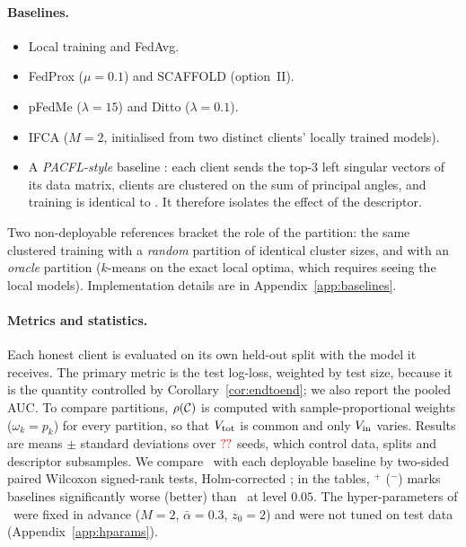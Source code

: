 \paragraph{Baselines.}
\begin{itemize}[leftmargin=1.2em,itemsep=2pt]
  \item Local training and FedAvg.
  \item FedProx ($\mu=0.1$) and SCAFFOLD (option~II).
  \item pFedMe ($\lambda=15$) and Ditto ($\lambda=0.1$).
  \item IFCA ($M=2$, initialised from two distinct clients' locally trained models).
  \item A \emph{PACFL-style} baseline \citep{vahidian2023efficient}: each client sends the
    top-$3$ left singular vectors of its data matrix, clients are clustered on the sum of
    principal angles, and training is identical to \ptopofl. It therefore isolates the
    effect of the descriptor.
\end{itemize}
Two non-deployable references bracket the role of the partition: the same clustered training
with a \emph{random} partition of identical cluster sizes, and with an \emph{oracle}
partition ($k$-means on the exact local optima, which requires seeing the local models).
Implementation details are in Appendix~\ref{app:baselines}.

\paragraph{Metrics and statistics.}
Each honest client is evaluated on its own held-out split with the model it receives. The
primary metric is the test log-loss, weighted by test size, because it is the quantity
controlled by Corollary~\ref{cor:endtoend}; we also report the pooled AUC. To compare partitions, $\rho(\mathcal{C})$ is computed with
sample-proportional weights ($\omega_k=p_k$) for every partition, so that $V_{\mathrm{tot}}$ is common
and only $V_{\mathrm{in}}$ varies. Results are means
$\pm$ standard deviations over $\textcolor{red}{??}$ seeds, which control data, splits and descriptor
subsamples. We compare \ptopofl\ with each deployable baseline by two-sided paired Wilcoxon
signed-rank tests, Holm-corrected \citep{holm1979simple}; in the tables, $^{+}$ ($^{-}$)
marks baselines significantly worse (better) than \ptopofl\ at level $0.05$. The
hyper-parameters of \ptopofl\ were fixed in advance ($M=2$, $\bar\alpha=0.3$, $z_0=2$) and
were not tuned on test data (Appendix~\ref{app:hparams}).

